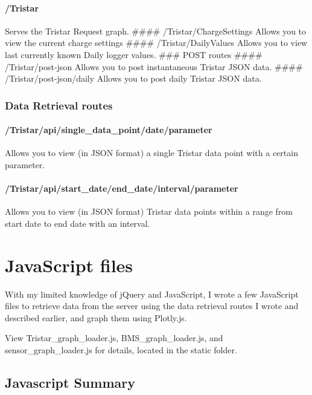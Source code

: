 \paragraph{/Tristar}\label{tristar-1}

Serves the Tristar Request graph. \#\#\#\# /Tristar/ChargeSettings
Allows you to view the current charge settings \#\#\#\#
/Tristar/DailyValues Allows you to view last currently known Daily
logger values. \#\#\# POST routes \#\#\#\# /Tristar/post-json Allows you
to post instantaneous Tristar JSON data. \#\#\#\#
/Tristar/post-json/daily Allows you to post daily Tristar JSON data.

\subsubsection{Data Retrieval routes}\label{data-retrieval-routes-2}

\paragraph{/Tristar/api/single\_data\_point/date/parameter}\label{tristarapisingleux5fdataux5fpointdateparameter}

Allows you to view (in JSON format) a single Tristar data point with a
certain parameter.

\paragraph{/Tristar/api/start\_date/end\_date/interval/parameter}\label{tristarapistartux5fdateendux5fdateintervalparameter}

Allows you to view (in JSON format) Tristar data points within a range
from start date to end date with an interval.

\section{JavaScript files}\label{javascript-files}

With my limited knowledge of jQuery and JavaScript, I wrote a few
JavaScript files to retrieve data from the server using the data
retrieval routes I wrote and described earlier, and graph them using
Plotly.js.

View Tristar\_graph\_loader.js, BMS\_graph\_loader.js, and
sensor\_graph\_loader.js for details, located in the static folder.

\subsection{Javascript Summary}\label{javascript-summary}


